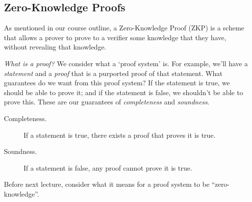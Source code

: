 
\subsection{Zero-Knowledge Proofs}
As mentioned in our course outline, a Zero-Knowledge Proof (ZKP) is a scheme that allows a prover to prove to a verifier some knowledge that they have, without revealing that knowledge.

\emph{What is a proof?} We consider what a `proof system' is. For example, we'll have a \emph{statement} and a \emph{proof} that is a purported proof of that statement. What guarantees do we want from this proof system? If the statement is true, we should be able to prove it; and if the statement is false, we shouldn't be able to prove this. These are our guarantees of \emph{completeness} and \emph{soundness}.
\begin{description}
    \item[Completeness.] If a statement is true, there exists a proof that proves it is true.
    \item[Soundness.] If a statement is false, any proof cannot prove it is true.
\end{description}

Before next lecture, consider what it means for a proof system to be ``zero-knowledge''.
